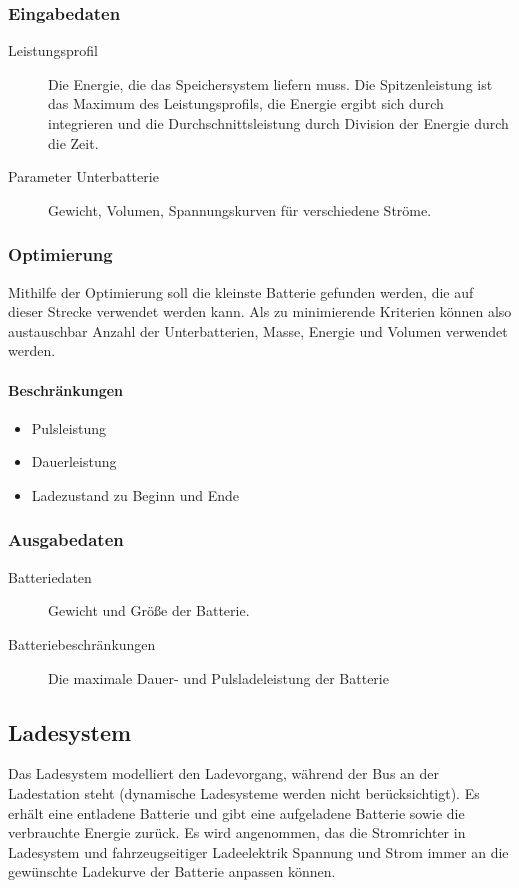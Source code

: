 \subsubsection{Eingabedaten}
\begin{description}
	\item[Leistungsprofil] Die Energie, die das Speichersystem liefern muss. Die Spitzenleistung ist das Maximum des Leistungsprofils, die Energie ergibt sich durch integrieren und die Durchschnittsleistung durch Division der Energie durch die Zeit. 
	\item[Parameter Unterbatterie] Gewicht, Volumen, Spannungskurven für verschiedene Ströme.
\end{description}

\subsubsection{Optimierung}
Mithilfe der Optimierung soll die kleinste Batterie gefunden werden, die auf dieser Strecke verwendet werden kann. Als zu minimierende Kriterien können also austauschbar Anzahl der Unterbatterien, Masse, Energie und Volumen verwendet werden.
\paragraph{Beschränkungen}
\begin{itemize}
	\item Pulsleistung
	\item Dauerleistung
	\item Ladezustand zu Beginn und Ende 
\end{itemize}

\subsubsection{Ausgabedaten}
\begin{description}
	\item[Batteriedaten] Gewicht und Größe der Batterie.
	\item[Batteriebeschränkungen] Die maximale Dauer- und Pulsladeleistung der Batterie
\end{description}

\subsection{Ladesystem}
Das Ladesystem modelliert den Ladevorgang, während der Bus an der Ladestation steht (dynamische Ladesysteme werden nicht berücksichtigt). Es erhält eine entladene Batterie und gibt eine aufgeladene Batterie sowie die verbrauchte Energie zurück.
Es wird angenommen, das die Stromrichter in Ladesystem und fahrzeugseitiger Ladeelektrik Spannung und Strom immer an die gewünschte Ladekurve der Batterie anpassen können.

